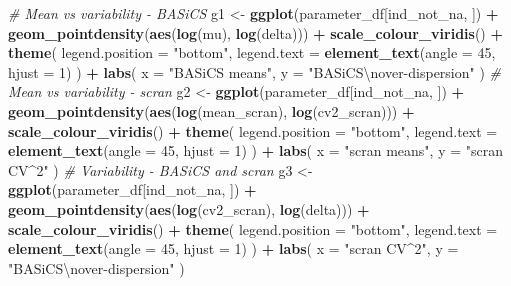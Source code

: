 \documentclass[9pt,a4paper,]{extarticle}
\newenvironment{Shaded}{\begin{snugshade}}{\end{snugshade}}
\newcommand{\CharTok}[1]{\textcolor[rgb]{0.31,0.60,0.02}{#1}}
\newcommand{\CommentTok}[1]{\textcolor[rgb]{0.56,0.35,0.01}{\textit{#1}}}
\newcommand{\DataTypeTok}[1]{\textcolor[rgb]{0.13,0.29,0.53}{#1}}
\newcommand{\DecValTok}[1]{\textcolor[rgb]{0.00,0.00,0.81}{#1}}
\newcommand{\KeywordTok}[1]{\textcolor[rgb]{0.13,0.29,0.53}{\textbf{#1}}}
\newcommand{\NormalTok}[1]{#1}
\newcommand{\OperatorTok}[1]{\textcolor[rgb]{0.81,0.36,0.00}{\textbf{#1}}}
\newcommand{\StringTok}[1]{\textcolor[rgb]{0.31,0.60,0.02}{#1}}
\begin{document}
\begin{Shaded}
\begin{Highlighting}[]
\CommentTok{# Mean vs variability - BASiCS}
\NormalTok{g1 <-}\StringTok{ }\KeywordTok{ggplot}\NormalTok{(parameter_df[ind_not_na, ]) }\OperatorTok{+}
\StringTok{  }\KeywordTok{geom_pointdensity}\NormalTok{(}\KeywordTok{aes}\NormalTok{(}\KeywordTok{log}\NormalTok{(mu), }\KeywordTok{log}\NormalTok{(delta))) }\OperatorTok{+}
\StringTok{  }\KeywordTok{scale_colour_viridis}\NormalTok{() }\OperatorTok{+}
\StringTok{  }\KeywordTok{theme}\NormalTok{(}
    \DataTypeTok{legend.position =} \StringTok{"bottom"}\NormalTok{,}
    \DataTypeTok{legend.text =} \KeywordTok{element_text}\NormalTok{(}\DataTypeTok{angle =} \DecValTok{45}\NormalTok{, }\DataTypeTok{hjust =} \DecValTok{1}\NormalTok{)}
\NormalTok{  ) }\OperatorTok{+}
\StringTok{  }\KeywordTok{labs}\NormalTok{(}
    \DataTypeTok{x =} \StringTok{"BASiCS means"}\NormalTok{,}
    \DataTypeTok{y =} \StringTok{"BASiCS}\CharTok{\textbackslash{}n}\StringTok{over-dispersion"}
\NormalTok{  )}
\CommentTok{# Mean vs variability - scran}
\NormalTok{g2 <-}\StringTok{ }\KeywordTok{ggplot}\NormalTok{(parameter_df[ind_not_na, ]) }\OperatorTok{+}
\StringTok{  }\KeywordTok{geom_pointdensity}\NormalTok{(}\KeywordTok{aes}\NormalTok{(}\KeywordTok{log}\NormalTok{(mean_scran), }\KeywordTok{log}\NormalTok{(cv2_scran))) }\OperatorTok{+}
\StringTok{  }\KeywordTok{scale_colour_viridis}\NormalTok{() }\OperatorTok{+}
\StringTok{  }\KeywordTok{theme}\NormalTok{(}
    \DataTypeTok{legend.position =} \StringTok{"bottom"}\NormalTok{,}
    \DataTypeTok{legend.text =} \KeywordTok{element_text}\NormalTok{(}\DataTypeTok{angle =} \DecValTok{45}\NormalTok{, }\DataTypeTok{hjust =} \DecValTok{1}\NormalTok{)}
\NormalTok{  ) }\OperatorTok{+}
\StringTok{  }\KeywordTok{labs}\NormalTok{(}
    \DataTypeTok{x =} \StringTok{"scran means"}\NormalTok{,}
    \DataTypeTok{y =} \StringTok{"scran CV^2"}
\NormalTok{  )}
\CommentTok{# Variability - BASiCS and scran}
\NormalTok{g3 <-}\StringTok{ }\KeywordTok{ggplot}\NormalTok{(parameter_df[ind_not_na, ]) }\OperatorTok{+}
\StringTok{  }\KeywordTok{geom_pointdensity}\NormalTok{(}\KeywordTok{aes}\NormalTok{(}\KeywordTok{log}\NormalTok{(cv2_scran), }\KeywordTok{log}\NormalTok{(delta))) }\OperatorTok{+}
\StringTok{  }\KeywordTok{scale_colour_viridis}\NormalTok{() }\OperatorTok{+}
\StringTok{  }\KeywordTok{theme}\NormalTok{(}
    \DataTypeTok{legend.position =} \StringTok{"bottom"}\NormalTok{,}
    \DataTypeTok{legend.text =} \KeywordTok{element_text}\NormalTok{(}\DataTypeTok{angle =} \DecValTok{45}\NormalTok{, }\DataTypeTok{hjust =} \DecValTok{1}\NormalTok{)}
\NormalTok{  ) }\OperatorTok{+}
\StringTok{  }\KeywordTok{labs}\NormalTok{(}
    \DataTypeTok{x =} \StringTok{"scran CV^2"}\NormalTok{,}
    \DataTypeTok{y =} \StringTok{"BASiCS}\CharTok{\textbackslash{}n}\StringTok{over-dispersion"}
\NormalTok{  )}


\end{Highlighting}
\end{Shaded}
\end{document}
